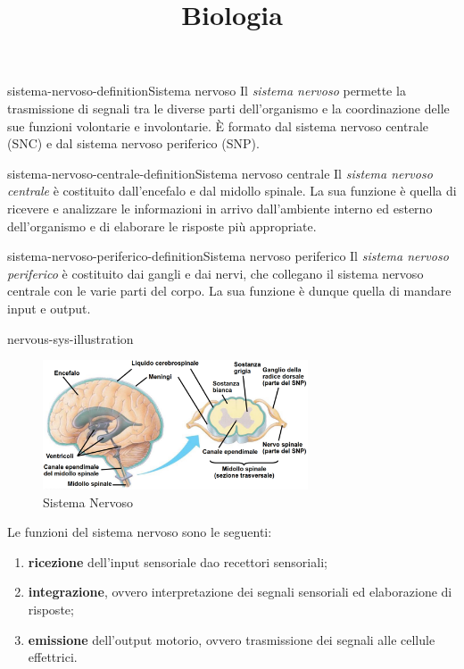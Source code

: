 \documentclass[preview]{standalone}
\begin{document}
\title{Biologia}
\genpage

\begin{snippetdefinition}{sistema-nervoso-definition}{Sistema nervoso}
    Il \textit{sistema nervoso} permette la trasmissione di segnali tra le diverse parti dell'organismo e
    la coordinazione delle sue funzioni volontarie e involontarie. È formato dal sistema nervoso
    centrale (SNC) e dal sistema nervoso periferico (SNP).
\end{snippetdefinition}

\begin{snippetdefinition}{sistema-nervoso-centrale-definition}{Sistema nervoso centrale}
    Il \textit{sistema nervoso centrale} è costituito dall'encefalo e dal midollo spinale.
    La sua funzione è quella di ricevere e analizzare le informazioni in
    arrivo dall'ambiente interno ed esterno dell'organismo e di elaborare le risposte più appropriate.
\end{snippetdefinition}

\begin{snippetdefinition}{sistema-nervoso-periferico-definition}{Sistema nervoso periferico}
    Il \textit{sistema nervoso periferico} è costituito dai 
    gangli e dai nervi, che collegano il sistema nervoso centrale
    con le varie parti del corpo.
    La sua funzione è dunque quella di mandare input e output.
\end{snippetdefinition}

\begin{snippet}{nervous-sys-illustration}
    \setlength{\intextsep}{0pt}%
    \begin{figure}
        \includegraphics[width=0.7\textwidth]{./resources/nervous_system.png}
        \caption{Sistema Nervoso}
        \vspace{-1cm}
    \end{figure}
    
    Le funzioni del sistema nervoso sono le seguenti:
    \begin{enumerate}
        \item \textbf{ricezione} dell'input sensoriale dao recettori sensoriali;
        \item \textbf{integrazione}, ovvero interpretazione dei segnali sensoriali ed elaborazione di risposte;
        \item \textbf{emissione} dell'output motorio, ovvero trasmissione dei segnali alle cellule effettrici.
    \end{enumerate}
    
    \wrapfill
\end{snippet}
\end{document}
